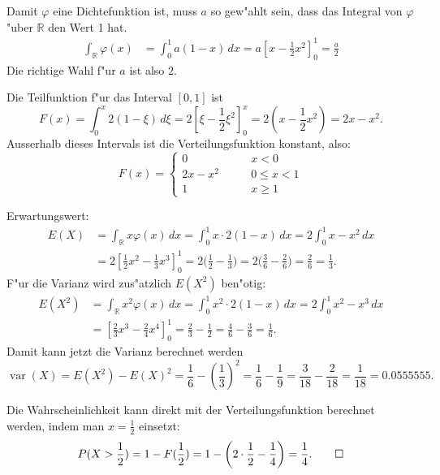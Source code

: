 \begin{loesung}
\begin{teilaufgaben}
\item
Damit $\varphi$ eine Dichtefunktion ist, muss $a$ so gew"ahlt sein,
dass das Integral von $\varphi$ "uber $\mathbb R$ den Wert 1 hat.
\begin{align*}
\int_{\mathbb R}\varphi(x)
&=
\int_{0}^{1}a(1-x)\,dx=a\left[x-\frac12x^2\right]_0^1
=
\frac{a}2
\end{align*}
Die richtige Wahl f"ur $a$ ist also $2$.
\item
Die Teilfunktion f"ur das Interval $[0,1]$ ist
\[
F(x)=\int_{0}^x 2(1-\xi)\,d\xi
=
2\left[\xi - \frac12\xi^2\right]_0^x
=
2(x-\frac12x^2)
=
2x-x^2.
\]
Ausserhalb dieses Intervals ist die Verteilungsfunktion konstant, also:
\[
F(x)=\begin{cases}
0&\qquad x < 0\\
2x-x^2
&\qquad 0 \le x < 1\\
1&\qquad x\ge1
\end{cases}
\]
\item
Erwartungswert:
\begin{align*}
E(X)&=\int_{\mathbb R} x\varphi(x)\,dx
=
\int_0^1x\cdot 2(1-x)\,dx
=
2\int_0^1 x-x^2\,dx
\\
&=
2\left[\frac12x^2-\frac13x^3\right]_0^1
=2\biggl(\frac12-\frac13\biggr)
=2\biggl(\frac3{6}-\frac{2}{6}\biggr)
=\frac2{6}=\frac13.
\end{align*}
F"ur die Varianz wird zus"atzlich $E(X^2)$ ben"otig:
\begin{align*}
E(X^2)
&=
\int_{\mathbb R} x^2\varphi(x)\,dx
=
\int_0^1x^2\cdot 2(1-x)\,dx
=
2\int_0^1 x^2-x^3\,dx
\\
&=\left[\frac23x^3-\frac24x^4\right]_0^1
=\frac23-\frac12=\frac4{6}-\frac{3}{6}=\frac{1}{6}.
\end{align*}
Damit kann jetzt die Varianz berechnet werden
\[
\operatorname{var}(X)=E(X^2)-E(X)^2=\frac{1}{6}-\left(\frac{1}{3}\right)^2
=\frac16-\frac19=\frac3{18}-\frac2{18}
=\frac{1}{18}=0.0555555.
\]
\item
Die Wahrscheinlichkeit kann direkt mit der Verteilungsfunktion
berechnet werden, indem man $x=\frac12$ einsetzt:
\[
P(X>\frac12)
=
1-F(\frac12)=1-\biggl(2\cdot \frac12-\frac14\biggr)=\frac14.
\qedhere
\]
\end{teilaufgaben}
\end{loesung}

